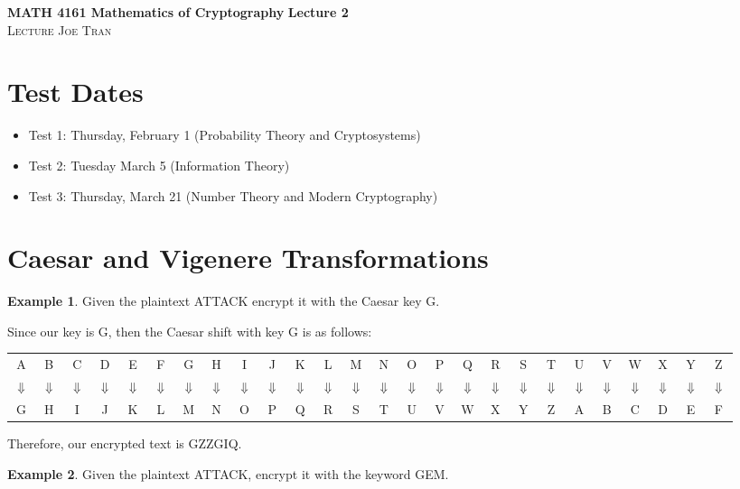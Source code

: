 \documentclass[11pt]{amsart}
\theoremstyle{definition}\newtheorem{definition}{Definition}
\theoremstyle{definition}\newtheorem{example}{Example}
\theoremstyle{definition}\newtheorem{samplecode}{Sample Code}
\begin{document}
\noindent \textbf{MATH 4161 Mathematics of Cryptography} \hfill \textbf{Lecture 2} \\
\noindent \textsc{Lecture} \hfill \textsc{Joe Tran}

\section{Test Dates}
\begin{itemize}
    \item Test 1: Thursday, February 1 (Probability Theory and Cryptosystems)
    \item Test 2: Tuesday March 5 (Information Theory)
    \item Test 3: Thursday, March 21 (Number Theory and Modern Cryptography)
\end{itemize}

\section{Caesar and Vigenere Transformations}

\begin{example}
    Given the plaintext ATTACK encrypt it with the Caesar key G.
\end{example}

Since our key is G, then the Caesar shift with key G is as follows:
\begin{center}
    \begin{tabular}{cccccccccccccccccccccccccc}
        A & B & C & D & E & F & G & H & I & J & K & L & M & N & O & P & Q & R & S & T & U & V & W & X & Y & Z \\
        $\Downarrow$ & $\Downarrow$ & $\Downarrow$ & $\Downarrow$ & $\Downarrow$ & $\Downarrow$ & $\Downarrow$ & $\Downarrow$ & $\Downarrow$ & $\Downarrow$ & $\Downarrow$ & $\Downarrow$ & $\Downarrow$ & $\Downarrow$ & $\Downarrow$ & $\Downarrow$ & $\Downarrow$ & $\Downarrow$ & $\Downarrow$ & $\Downarrow$ & $\Downarrow$ & $\Downarrow$ & $\Downarrow$ & $\Downarrow$ & $\Downarrow$ & $\Downarrow$ \\
        G & H & I & J & K & L & M & N & O & P & Q & R & S & T & U & V & W & X & Y & Z & A & B & C & D & E & F
    \end{tabular}
\end{center}
Therefore, our encrypted text is GZZGIQ.

\begin{example}
    Given the plaintext ATTACK, encrypt it with the keyword GEM.
\end{example}
\end{document}
